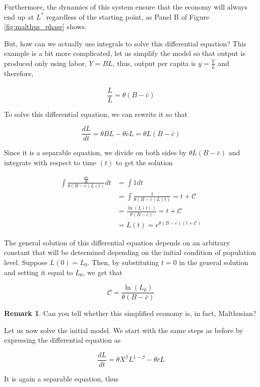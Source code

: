 \documentclass[a4paper,11pt]{article}
\theoremstyle{definition}
\newtheorem{remark}{Remark}
\theoremstyle{plain}
\begin{document}
Furthermore, the dynamics of this system ensure that the economy will always end up at \(L^*\) regardless of the starting point, as Panel B of Figure \ref{fig:malthus_phase} shows.

But, how can we actually use integrals to solve this differential equation? This example is a bit more complicated, let us simplify the model so that output is produced only using labor, \(Y = B L\), thus, output per capita is \(y = \frac{Y}{L}\) and therefore,

\[
\frac{\dot{L}}{L} = \theta\left(B - \bar{c}\right)
\]

To solve this differential equation, we can rewrite it so that

\[
\frac{dL}{dt} = \theta BL - \theta \bar{c} L = \theta L\left(B-\bar{c}\right)
\]

Since it is a separable equation, we divide on both sides by \(\theta L\left(B-\bar{c}\right)\) and integrate with respect to time \((t)\) to get the solution

\begin{align*}
\int \frac{\frac{dL}{dt}}{\theta\left(B-\bar{c}\right)L(t)} dt & = \int 1 dt \\
&= \int\frac{1}{\theta\left(B-\bar{c}\right)L(t)} = t + \mathcal{C} \\
&= \frac{\ln(L(t))}{\theta\left(B-\bar{c}\right)} = t + \mathcal{C} \\
&= L(t) = e^{\theta\left(B-\bar{c}\right)\left(t+\mathcal{C}\right)}
\end{align*}

The general solution of this differential equation depends on an arbitrary constant that will be determined depending on the initial condition of population level. Suppose \(L(0) = L_0\). Then, by substituting \(t = 0\) in the general solution and setting it equal to
\(L_0\), we get that

\[
\mathcal{C} = \frac{\ln\left(L_0\right)}{\theta\left(B-\bar{c}\right)}
\]

\begin{remark}
Can you tell whether this simplified economy is, in fact, Malthusian?
\end{remark}

Let us now solve the initial model. We start with the same steps as before by expressing the differential equation as

\[
\frac{dL}{dt} = \theta X^{\beta}L^{1-\beta} - \theta\bar{c}L
\]

It is again a separable equation, thus
\end{document}
